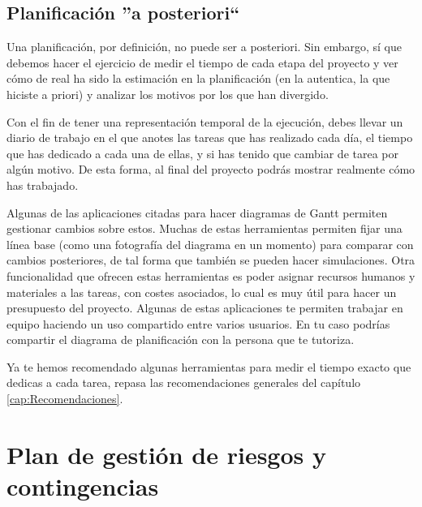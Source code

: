 \subsection{Planificación ''a posteriori``}

Una planificación, por definición, no puede ser a posteriori. Sin embargo, sí que debemos hacer el ejercicio de medir el tiempo de cada etapa del proyecto y ver cómo de real ha sido la estimación en la planificación (en la autentica, la que hiciste a priori) y analizar los motivos por los que han divergido.

Con el fin de tener una representación temporal de la ejecución, debes llevar un diario de trabajo en el que anotes las tareas que has realizado cada día, el tiempo que has dedicado a cada una de ellas, y si has tenido que cambiar de tarea por algún motivo. De esta forma, al final del proyecto podrás mostrar realmente cómo has trabajado. 


Algunas de las aplicaciones citadas para hacer diagramas de Gantt permiten gestionar cambios sobre estos. Muchas de estas herramientas permiten fijar una línea base (como una fotografía del diagrama en un momento) para comparar con cambios posteriores, de tal forma que también se pueden hacer simulaciones. Otra funcionalidad que ofrecen estas herramientas es poder asignar recursos humanos y materiales a las tareas, con costes asociados, lo cual es muy útil para hacer un presupuesto del proyecto. Algunas de estas aplicaciones te permiten trabajar en equipo haciendo un uso compartido entre varios usuarios. En tu caso podrías compartir el diagrama de planificación con la persona que te tutoriza.

Ya te hemos recomendado algunas herramientas para medir el tiempo exacto que dedicas a cada tarea, repasa las recomendaciones generales del capítulo \ref{cap:Recomendaciones}.



\section{Plan de gestión de riesgos y contingencias}


